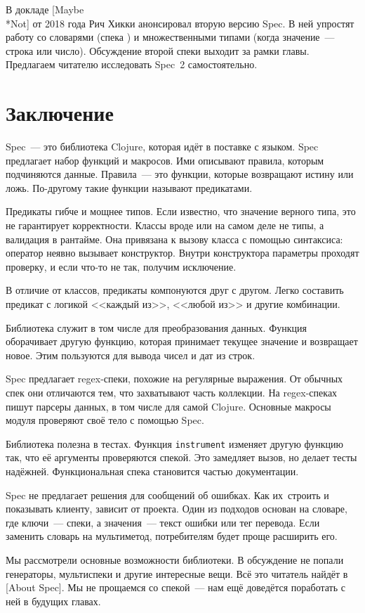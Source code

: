 В докладе [Maybe\\*Not]
от 2018 года Рич Хикки анонсировал вторую версию Spec. В ней упростят работу со
словарями (спека ) и множественными типами (когда значение~---
строка или число). Обсуждение второй спеки выходит за рамки главы. Предлагаем
читателю исследовать Spec~2 самостоятельно.

\section{Заключение}

Spec~--- это библиотека Clojure, которая идёт в поставке с языком. Spec
предлагает набор функций и макросов. Ими описывают правила, которым подчиняются
данные. Правила~--- это функции, которые возвращают истину или ложь. По-другому
такие функции называют предикатами.

Предикаты гибче и мощнее типов. Если известно, что значение верного типа, это не
гарантирует корректности. Классы вроде  или  на
самом деле не типы, а валидация в рантайме. Она привязана к вызову класса с
помощью синтаксиса: оператор  неявно вызывает конструктор. Внутри
конструктора параметры проходят проверку, и если что-то не так, получим
исключение.

В отличие от классов, предикаты компонуются друг с другом. Легко составить
предикат с логикой <<каждый из>>, <<любой из>> и другие комбинации.

Библиотека служит в том числе для преобразования данных. Функция
 оборачивает другую функцию, которая принимает текущее значение
и возвращает новое. Этим пользуются для вывода чисел и дат из строк.

Spec предлагает regex-спеки, похожие на регулярные выражения. От обычных спек
они отличаются тем, что захватывают часть коллекции. На regex-спеках пишут
парсеры данных, в том числе для самой Clojure. Основные макросы модуля
 проверяют своё тело с помощью Spec.

Библиотека полезна в тестах. Функция \texttt{in\-stru\-ment} изменяет другую
функцию так, что её аргументы проверяются спекой. Это замедляет вызов, но делает
тесты надёжней. Функциональная спека становится частью документации.

Spec не предлагает решения для сообщений об ошибках. Как их~строить и показывать
клиенту, зависит от проекта. Один из подходов основан на словаре, где ключи~---
спеки, а значения~--- текст ошибки или тег перевода. Если заменить словарь на
мультиметод, потребителям будет проще расширить его.

Мы рассмотрели основные возможности библиотеки. В обсуждение не попали
генераторы, мультиспеки и другие интересные вещи. Всё это читатель найдёт в
[About Spec].
Мы не прощаемся со спекой~--- нам ещё доведётся поработать с ней в будущих главах.
